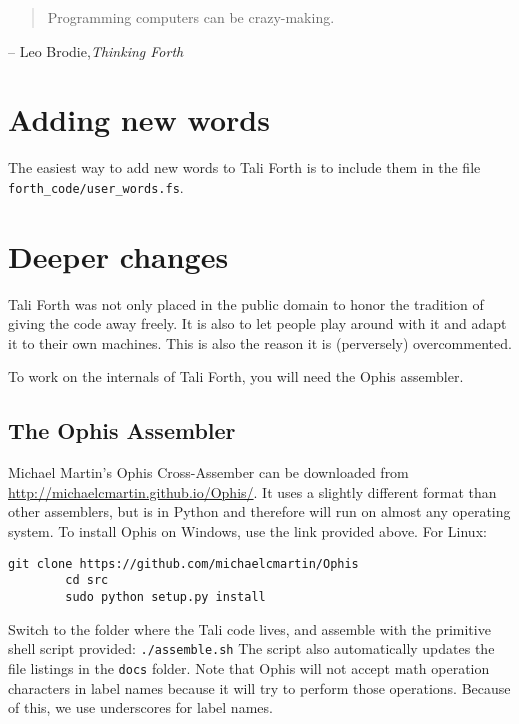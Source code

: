 
\begin{quote}
        Programming computers can be crazy-making.
\end{quote}
\begin{flushright}
        -- Leo Brodie,\textit{Thinking Forth}\cite{brodie84}
\end{flushright}



\section{Adding new words}

The easiest way to add new words to Tali Forth is to include them in the file
\texttt{forth\_code/user\_words.fs}. 


\section{Deeper changes}

Tali Forth was not only placed in the public domain to honor the tradition of
giving the code away freely. It is also to let people play around with it and
adapt it to their own machines. This is also the reason it is (perversely)
overcommented.

To work on the internals of Tali Forth, you will need the Ophis assembler.

\subsection{The Ophis Assembler}

Michael Martin's Ophis Cross-Assember can be downloaded from
\href{http://michaelcmartin.github.io/Ophis/}{http://michaelcmartin.github.io/Ophis/}.
It uses a slightly different format than other assemblers, but is in
Python and
therefore will run on almost any operating system. To install Ophis on Windows,
use the link provided above. For Linux:

\begin{lstlisting}[frame=lines]
        git clone https://github.com/michaelcmartin/Ophis
        cd src
        sudo python setup.py install
\end{lstlisting}

Switch to the folder where the Tali code lives, and assemble with the primitive
shell script provided: \texttt{./assemble.sh} The script also automatically
updates the file listings in the \texttt{docs} folder. Note that Ophis will not
accept math operation characters in label names because it will try to perform
those operations. Because of this, we use underscores for label names.

